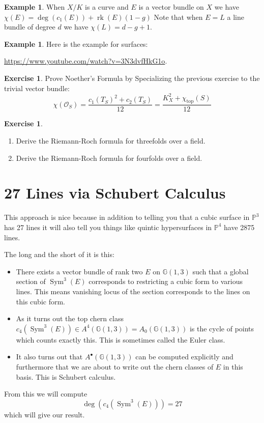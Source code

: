 \documentclass[12pt]{article}
\numberwithin{equation}{section}
\theoremstyle{definition}
\newtheorem{example}[theorem]{Example}
\newtheorem{exercise}[theorem]{Exercise}
\theoremstyle{remark}
\newcommand{\Ocal}{\mathcal{O}}
\newcommand{\PP}{\mathbb{P}}
\newcommand{\Sym}{\operatorname{Sym}}
\newcommand{\rk}{\operatorname{rk}}
\renewcommand{\top}{\operatorname{top}}
\newcommand{\GG}{\mathbb{G}}
\renewcommand{\top}{\operatorname{top}}
\begin{document}
\begin{example}
	When $X/K$ is a curve and $E$ is a vector bundle on $X$ we have 
	$\chi(E) = \deg(c_1(E)) + \rk(E)(1-g)$
	Note that when $E=L$ a line bundle of degree $d$ we have $\chi(L) = d-g+1.$
\end{example}

\begin{example}
	Here is the example for surfaces:
	\begin{center}
		\url{https://www.youtube.com/watch?v=3N3dvfHkG1o}.
	\end{center}
	
	
\end{example}

\begin{exercise}
	Prove Noether's Formula by Specializing the previous exercise to the trivial vector bundle:
	$$ \chi(\Ocal_S) = \frac{c_1(T_S)^2+c_2(T_S)}{12} = \frac{K_X^2+\chi_{\top}(S)}{12} $$
\end{exercise}

\begin{exercise}
	\begin{enumerate}
		\item Derive the Riemann-Roch formula for threefolds over a field. 
		\item Derive the Riemann-Roch formula for fourfolds over a field.
	\end{enumerate}
\end{exercise}

\section{27 Lines via Schubert Calculus}

This approach is nice because in addition to telling you that a cubic surface in $\PP^3$ has 27 lines it will also tell you things like quintic hypersurfaces in $\PP^4$ have 2875 lines. 

The long and the short of it is this: 
\begin{itemize}
	\item There exists a vector bundle of rank two $E$ on $\GG(1,3)$ such that a global section of $\Sym^3(E)$ corresponds to restricting a cubic form to various lines.
	This means vanishing locus of the section corresponds to the lines on this cubic form. 
	\item As it turns out the top chern class $c_4(\Sym^3(E)) \in A^4(\GG(1,3))=A_0(\GG(1,3))$ is the cycle of points which counts exactly this. 
	This is sometimes called the Euler class. 
	\item It also turns out that $A^{\bullet}(\GG(1,3))$ can be computed explicitly and furthermore that we are about to write out the chern classes of $E$ in this basis. This is Schubert calculus. 
\end{itemize}
From this we will compute 
$$ \deg( c_4(\Sym^3(E)) ) = 27 $$
which will give our result.
\end{document}
